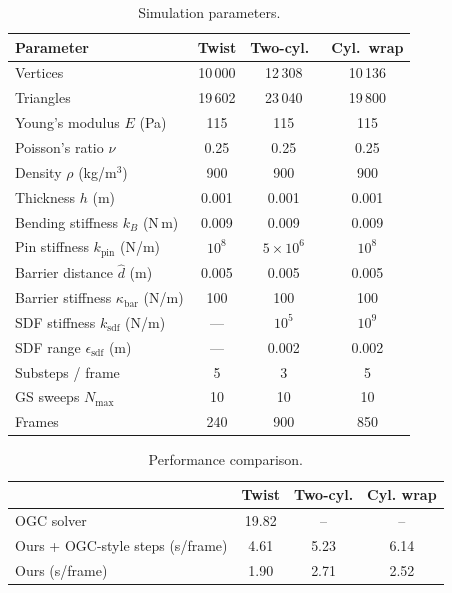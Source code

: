 \documentclass[acmtog,anonymous,review]{acmart}
\begin{document}
\begin{table}[!ht]
  \centering
  \caption{Simulation parameters.}
  \label{tab:params}
  \begin{tabular}{lccc}
    \toprule
    Parameter & Twist & Two-cyl.\ & Cyl.\ wrap \\
    \midrule
    Vertices                                   & 10\,000   & 12\,308   & 10\,136   \\
    Triangles                                  & 19\,602   & 23\,040   & 19\,800   \\
    Young's modulus $E$ (Pa)                   & 115       & 115       & 115       \\
    Poisson's ratio $\nu$                      & 0.25      & 0.25      & 0.25      \\
    Density $\rho$ (kg/m$^3$)                  & 900       & 900       & 900       \\
    Thickness $h$ (m)                          & 0.001     & 0.001     & 0.001     \\
    Bending stiffness $k_B$ (N\,m)             & 0.009     & 0.009     & 0.009     \\
    Pin stiffness $k_{\mathrm{pin}}$ (N/m)     & $10^8$    & $5\!\times\!10^6$ & $10^8$ \\
    Barrier distance $\hat{d}$ (m)             & 0.005     & 0.005     & 0.005     \\
    Barrier stiffness $\kappa_{\mathrm{bar}}$ (N/m) & 100  & 100       & 100       \\
    SDF stiffness $k_{\mathrm{sdf}}$ (N/m)     & ---       & $10^5$    & $10^9$    \\
    SDF range $\epsilon_{\mathrm{sdf}}$ (m)     & ---       & 0.002     & 0.002     \\
    Substeps / frame                           & 5         & 3         & 5         \\
    GS sweeps $N_{\mathrm{max}}$               & 10        & 10        & 10        \\
    Frames                                     & 240       & 900       & 850       \\
    \bottomrule
  \end{tabular}
\end{table}

\begin{table}[!ht]
  \centering
  \caption{Performance comparison.}
  \label{tab:perf}
  \begin{tabular}{lccc}
    \toprule
    & Twist & Two-cyl. & Cyl. wrap \\
    \midrule 
    OGC solver & 19.82 & -- & -- \\
    Ours + OGC-style steps (s/frame) & 4.61 & 5.23 & 6.14 \\
    Ours (s/frame)                   & 1.90 & 2.71 & 2.52 \\
    \midrule
    \bottomrule
  \end{tabular}
\end{table}
\end{document}
